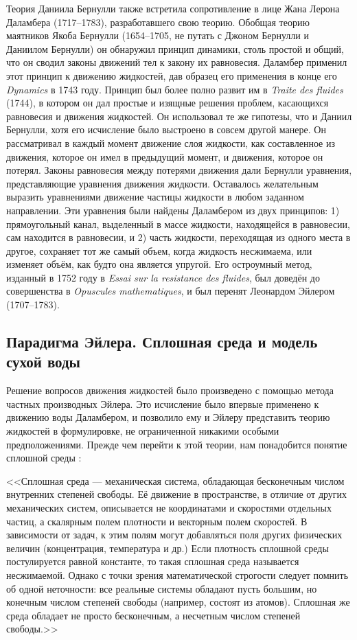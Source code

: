 Теория Даниила Бернулли также встретила сопротивление в лице Жана Лерона Даламбера (1717--1783), разработавшего 
свою теорию. Обобщая теорию маятников Якоба Бернулли (1654--1705, не путать с Джоном Бернулли и Даниилом Бернулли) 
он обнаружил принцип динамики, столь простой и общий, что он сводил законы движений тел к закону их равновесия. 
Даламбер применил этот принцип к движению жидкостей, дав образец его применения в конце его \textit{Dynamics} 
в 1743 году. Принцип был более полно развит им в \textit{Traite des fluides} (1744), в котором он дал простые 
и изящные решения проблем, касающихся равновесия и движения жидкостей. Он использовал те же гипотезы, что и 
Даниил Бернулли, хотя его исчисление было выстроено в совсем другой манере. Он рассматривал в каждый момент 
движение слоя жидкости, как составленное из движения, которое он имел в предыдущий момент, и движения, которое 
он потерял. Законы равновесия между потерями движения дали Бернулли уравнения, представляющие уравнения движения
жидкости. Оставалось желательным выразить уравнениями движение частицы жидкости в любом заданном направлении. 
Эти уравнения были найдены Даламбером из двух принципов: 1) прямоугольный канал, выделенный в массе жидкости, 
находящейся в равновесии, сам находится в равновесии, и 2) часть жидкости, переходящая из одного места в другое, 
сохраняет тот же самый объем, когда жидкость несжимаема, или изменяет объём, как будто она является упругой.
 Его остроумный метод, изданный в 1752 году в \textit{Essai sur la resistance des fluides}, был доведён до 
 совершенства в \textit{Opuscules mathematiques}, и был перенят Леонардом Эйлером (1707--1783).

\subsection*{Парадигма Эйлера. Сплошная среда и модель сухой воды}

Решение вопросов движения жидкостей было произведено с помощью метода частных производных Эйлера. 
Это исчисление было впервые применено к движению воды Даламбером, и позволило ему и Эйлеру представить теорию
 жидкостей в формулировке, не ограниченной никакими особыми предположениями. Прежде чем перейти к этой теории, 
 нам понадобится понятие сплошной среды \cite{wiki}:

<<Сплошная среда — механическая система, обладающая бесконечным числом внутренних степеней свободы. Её движение 
в пространстве, в отличие от других механических систем, описывается не координатами и скоростями отдельных 
частиц, а скалярным полем плотности и векторным полем скоростей. В зависимости от задач, к этим полям могут 
добавляться поля других физических величин (концентрация, температура и др.) Если плотность сплошной среды 
постулируется равной константе, то такая сплошная среда называется несжимаемой. Однако с точки зрения 
математической строгости следует помнить об одной неточности: все реальные системы обладают пусть большим, 
но конечным числом степеней свободы (например, состоят из атомов). Сплошная же среда обладает не просто 
бесконечным, а несчетным числом степеней свободы.>>

